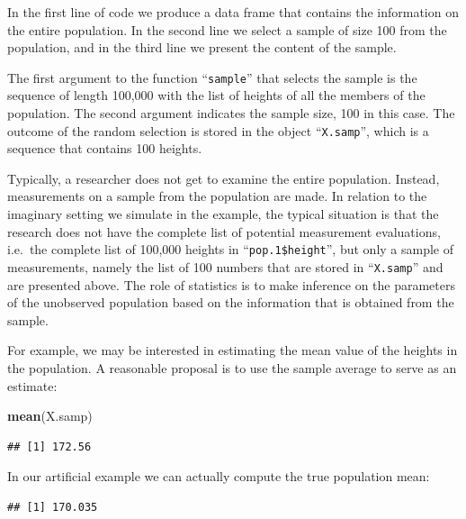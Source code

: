 \documentclass[]{krantz}
\makeatletter
\newenvironment{Shaded}{\begin{snugshade}}{\end{snugshade}}
\newcommand{\FloatTok}[1]{\textcolor[rgb]{0.00,0.00,0.81}{#1}}
\newcommand{\KeywordTok}[1]{\textcolor[rgb]{0.13,0.29,0.53}{\textbf{#1}}}
\newcommand{\NormalTok}[1]{#1}
\newcommand{\OperatorTok}[1]{\textcolor[rgb]{0.81,0.36,0.00}{\textbf{#1}}}
\newenvironment{kframe}{%
\medskip{}
\setlength{\fboxsep}{.8em}
 \def\at@end@of@kframe{}%
 \ifinner\ifhmode%
  \def\at@end@of@kframe{\end{minipage}}%
  \begin{minipage}{\columnwidth}%
 \fi\fi%
 \def\FrameCommand##1{\hskip\@totalleftmargin \hskip-\fboxsep
 \colorbox{shadecolor}{##1}\hskip-\fboxsep
     \hskip-\linewidth \hskip-\@totalleftmargin \hskip\columnwidth}%
 \MakeFramed {\advance\hsize-\width
   \@totalleftmargin\z@ \linewidth\hsize
   \@setminipage}}%
 {\par\unskip\endMakeFramed%
 \at@end@of@kframe}
\renewenvironment{Shaded}{\begin{kframe}}{\end{kframe}}
\theoremstyle{definition}
\theoremstyle{definition}
\theoremstyle{definition}
\theoremstyle{remark}
\makeatother
\begin{document}
In the first line of code we produce a data frame that contains the
information on the entire population. In the second line we select a
sample of size 100 from the population, and in the third line we present
the content of the sample.

The first argument to the function ``\texttt{sample}'' that selects the sample is
the sequence of length 100,000 with the list of heights of all the
members of the population. The second argument indicates the sample
size, 100 in this case. The outcome of the random selection is stored in
the object ``\texttt{X.samp}'', which is a sequence that contains 100 heights.

Typically, a researcher does not get to examine the entire population.
Instead, measurements on a sample from the population are made. In
relation to the imaginary setting we simulate in the example, the
typical situation is that the research does not have the complete list
of potential measurement evaluations, i.e.~the complete list of 100,000
heights in ``\texttt{pop.1\$height}'', but only a sample of measurements, namely
the list of 100 numbers that are stored in ``\texttt{X.samp}'' and are presented
above. The role of statistics is to make inference on the parameters of
the unobserved population based on the information that is obtained from
the sample.

For example, we may be interested in estimating the mean value of the
heights in the population. A reasonable proposal is to use the sample
average to serve as an estimate:

\begin{Shaded}
\begin{Highlighting}[]
\KeywordTok{mean}\NormalTok{(X.samp)}
\end{Highlighting}
\end{Shaded}

\begin{verbatim}
## [1] 172.56
\end{verbatim}

In our artificial example we can actually compute the true population
mean:

\begin{Shaded}
\end{Shaded}

\begin{verbatim}
## [1] 170.035
\end{verbatim}
\end{document}
